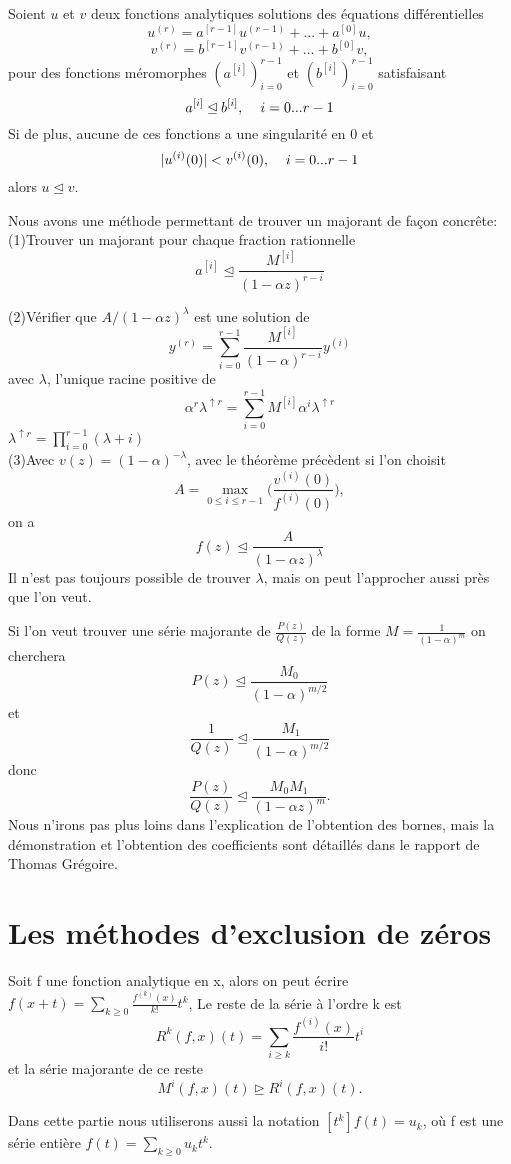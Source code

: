 \documentclass[a4paper,10.5pt]{article}
\begin{document}
	\begin{theorem}
		Soient $u$ et $v$ deux fonctions analytiques solutions des équations différentielles
		\[u^{(r)}=a^{[r-1]}u^{(r-1)}+...+a^{[0]}u,\]
		\[v^{(r)}=b^{[r-1]}v^{(r-1)}+...+b^{[0]}v,\]
		pour des fonctions méromorphes $(a^{[i]})_{i=0}^{r-1}$ et $(b^{[i]})_{i=0}^{r-1}$ satisfaisant 
		\[a^{[i]} \unlhd b^{[i]}, \hspace{4mm} i=0...r-1\]
		Si de plus, aucune de ces fonctions a une singularité en 0 et
		\[|u^{(i)}(0)|<v^{(i)}(0),\hspace{4mm} i=0...r-1\] 
		alors $u\unlhd v$.
	\end{theorem}
	Nous avons une méthode permettant de trouver un majorant de façon concrête:\\
	
	(1)Trouver un majorant pour chaque fraction rationnelle 
	\[a^{[i]} \unlhd \frac{M^{[i]}}{(1-\alpha z)^{r-i}}\]
	
	(2)Vérifier que $A/(1-\alpha z)^\lambda$ est une solution de 
	\[y^{(r)}=\sum_{i=0}^{r-1}\frac{M^{[i]}}{(1-\alpha)^{r-i}}y^{(i)}\]
	avec $\lambda$, l'unique racine positive de\[\alpha^{r}\lambda^{\uparrow r}=\sum_{i=0}^{r-1}{M^{[i]}}\alpha^i\lambda^{\uparrow r} \]
	$\lambda^{\uparrow r}=\prod_{i=0}^{r-1}(\lambda+i)$\\
	
	(3)Avec $v(z)=(1-\alpha)^{-\lambda}$, avec le théorème précèdent si l'on choisit
	\[A=\max_{0\leq i\leq r-1}\Big(\frac{v^{(i)}(0)}{f^{(i)}(0)}\Big),\]
	on a
	\[f(z)\unlhd  \frac{A}{(1-\alpha z)^\lambda}\]
	Il n'est pas toujours possible de trouver $\lambda$, mais on peut l'approcher aussi près que l'on veut. 
	\vspace{3mm}
	
	\noindent Si l'on veut trouver une série majorante de $\frac{P(z)}{Q(z)}$ de la forme $M=\frac{1}{(1-\alpha)^m}$ on cherchera 
	\[P(z)\unlhd \frac{M_0}{(1-\alpha)^{m/2}}\]
	et 
	\[\frac{1}{Q(z)}\unlhd \frac{M_1}{(1-\alpha)^{m/2}}\]
	donc 
	\[\frac{P(z)}{Q(z)}\unlhd \frac{M_0M_1}{(1-\alpha z)^{m}}.\]
	Nous n'irons pas plus loins dans l'explication de l'obtention des bornes, mais la démonstration et l'obtention des coefficients sont détaillés dans le rapport de Thomas Grégoire.
	\newpage

	\section{Les méthodes d'exclusion de zéros}
	\begin{definition} Soit f une fonction analytique en x, alors on peut écrire $f(x+t)=\sum_{k \geq 0} \frac{f^{(k)}(x)}{k!}t^{k}$, Le reste de la série à l'ordre k est 
		\[R^{k}(f,x)(t)=\sum_{i \geq k} \frac{f^{(i)}(x)}{i!}t^{i}\]
		et la série majorante de ce reste
		\[M^{i}(f,x)(t) \unrhd R^{i}(f,x)(t).\]
	\end{definition}
	Dans cette partie nous utiliserons aussi la notation $[t^k]f(t)=u_k$, où f est une série entière $f(t)=\sum_{k\geq0}u_kt^k$.
\end{document}
